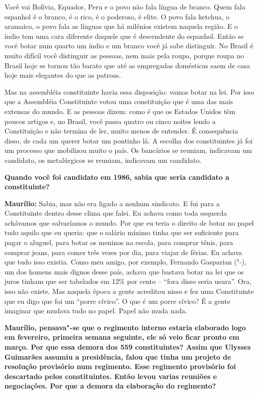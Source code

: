 Você vai Bolívia, Equador, Peru e o povo não fala língua de branco. Quem
fala espanhol é o branco, é o rico, é o poderoso, é elite. O povo fala
ketchua, o aramaico, o povo fala as línguas que há milênios existem
naquela região. E o índio tem uma cara diferente daquele que é
descendente do espanhol. Então se você botar num quarto um índio e um
branco você já sabe distinguir. No Brasil é muito difícil você
distinguir as pessoas, nem mais pela roupa, porque roupa no Brasil hoje
se tornou tão barato que até as empregadas domésticas saem de casa hoje
mais elegantes do que as patroas.

Mas na assembléia constituinte havia essa disposição: vamos botar na
lei. Por isso que a Assembléia Constituinte votou uma constituição que é
uma das mais extensas do mundo. E as pessoas dizem: como é que os
Estados Unidos têm poucos artigos e, no Brasil, você passa quatro ou
cinco noites lendo a Constituição e não termina de ler, muito menos de
entender. É consequência disso, de cada um querer botar um pontinho lá.
A escolha dos constituintes já foi um processo que mobilizou muito o
país. Os bancários se reuniam, indicavam um candidato, os metalúrgicos
se reuniam, indicavam um candidato.

\textbf{Quando você foi candidato em 1986, sabia que seria candidato a
constituinte?}

\textbf{Maurílio:} Sabia, mas não era ligado a nenhum sindicato. E fui
para a Constituinte dentro desse clima que falei. Eu achava como toda
esquerda achávamos que salvaríamos o mundo. Por que eu teria o direito
de botar no papel tudo aquilo que eu queria: que o salário mínimo tinha
que ser suficiente para pagar o aluguel, para botar os meninos na
escola, para comprar tênis, para comprar jeans, para comer três vezes
por dia, para viajar de férias. Eu achava que tudo isso existia. Como
meu amigo, por exemplo, Fernando Gasparian ("-), um dos homens mais
dignos desse país, achava que bastava botar na lei que os juros tinham
que ser tabelados em 12\% por cento -- ``fora disso seria usura''. Ora,
isso não existe. Mas naquela época a gente acreditou nisso e fez uma
Constituinte que eu digo que foi um ``porre cívico''. O que é um porre
cívico? É a gente imaginar que mudava tudo no papel. Papel não muda
nada.

\textbf{Maurílio, pensava"-se que o regimento interno estaria elaborado
logo em fevereiro, primeira semana seguinte, ele só veio ficar pronto em
março. Por que essa demora dos 559 constituintes? Assim que Ulysses
Guimarães assumiu a presidência, falou que tinha um projeto de resolução
provisório num regimento. Esse regimento provisório foi descartado pelos
constituintes. Então levou varias reuniões e negociações. Por que a
demora da elaboração do regimento?}

